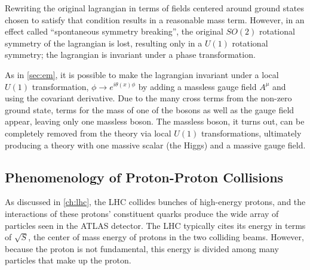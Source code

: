 Rewriting the original lagrangian in terms of fields centered around ground states chosen to satisfy that condition results in a reasonable mass term. However, in an effect called ``spontaneous symmetry breaking'', the original $SO(2)$ rotational symmetry of the lagrangian is lost, resulting only in a $U(1)$ rotational symmetry; the lagrangian is invariant under a phase transformation.

As in \autoref{sec:em}, it is possible to make the lagrangian invariant under a local $U(1)$ transformation, $\phi \rightarrow e^{i\theta(x)\phi}$ by adding a massless gauge field $A^\mu$ and using the covariant derivative. Due to the many cross terms from the non-zero ground state, terms for the mass of one of the bosons as well as the gauge field appear, leaving only one massless boson. The massless boson, it turns out, can be completely removed from the theory via local $U(1)$ transformations, ultimately producing a theory with one massive scalar (the Higgs) and a massive gauge field. 







\subsection{Phenomenology of Proton-Proton Collisions}
\label{sec:pp_collisions}

As discussed in \autoref{ch:lhc}, the \ac{LHC} collides bunches of high-energy protons, and the interactions of these protons' constituent quarks produce the wide array of particles seen in the ATLAS detector. The \ac{LHC} typically cites its energy in terms of $\sqrt{S}$, the center of mass energy of protons in the two colliding beams. However, because the proton is not fundamental, this energy is divided among many particles that make up the proton. 

